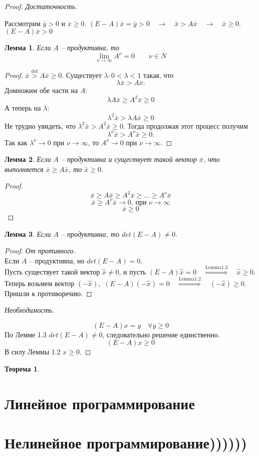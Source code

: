 \documentclass[12pt,a4paper,titlepage,oneside]{book}
\theoremstyle{definition}
\theoremstyle{plain}
\newtheorem{theorem}{Теорема}[chapter]
\theoremstyle{remark}
\theoremstyle{remark}
\theoremstyle{plain}
\newtheorem{lemma}{Лемма}[chapter]
\theoremstyle{plain}
\begin{document}
\begin{proof}
\textit{Достаточность.}

Рассмотрим $\bar{y} > 0$ и $\bar{x} \geq 0$. $(E-A)\bar{x} = \bar{y} > 0 \quad \rightarrow \quad \bar{x} > A\bar{x} \quad \rightarrow \quad \bar{x} \geq 0$. $(E-A)\bar{x} > 0$ 
\begin{lemma}
Если $A$ -- продуктивна, то
$$\lim_{\nu \to \infty} A^{\nu} = 0 \qquad \nu \in N$$

\end{lemma}
\begin{proof}
$ \bar{x} \overset{\mathrm{def}}{>} A \bar{x} \geq 0$. Существует $\lambda : 0 < \lambda < 1$ такая, что $$\lambda \bar{x} > A\bar{x}.$$ 
Домножим обе части на $A$:
$$\lambda A \bar{x} \geq A^2 \bar{x} \geq 0$$
А теперь на $\lambda$:
$$ \lambda^2 \bar{x} > \lambda A \bar{x} \geq 0$$
Не трудно увидеть, что $\lambda^2 \bar{x} > A^2 \bar{x} \geq 0$. Тогда продолжая этот процесс получим 
$$\lambda^{\nu} \bar{x} > A^{\nu} \bar{x} \geq 0.$$
Так как $\lambda^{\nu} \to 0$ при $ \nu \to \infty$, то $A^{\nu} \to 0 $ при $ \nu \to \infty.$
\end{proof}

\begin{lemma}
Если $A$ -- продуктивна и существует такой вектор $\bar{x}$, что выполняется $\bar{x} \geq A\bar{x}$, то $\bar{x} \geq 0.$
\end{lemma}
\begin{proof}

$$\bar{x} \geq A\bar{x} \geq A^2\bar{x} \geq \dots \geq A^{\nu} \bar{x}$$
$$\bar{x} \geq A^{\nu} \bar{x} \to 0 \text{, при } \nu \to \infty$$
$$\bar{x} \geq 0$$
\end{proof}

\begin{lemma}
Если $A$ -- продуктивна, то $det(E-A) \neq 0.$
\end{lemma}
\begin{proof}
\textit{От противного.}\\
Если $A$ -- продуктивна, но $det(E-A) = 0.$\\
Пусть существует такой вектор $\hat{x} \neq 0$, и пусть $(E-A)\hat{x} = 0 \quad \overset{\mathrm{Lemma 1.2}}{\Longrightarrow} \quad \hat{x} \geq 0$.\\
Теперь возьмем вектор $(-\hat{x}),$ $(E-A)(-\hat{x}) = 0 \quad \overset{\mathrm{Lemma 1.2}}{\Longrightarrow} \quad (-\hat{x}) \geq 0.$
Пришли к противоречию.
\end{proof}

\textit{Необходимость.}

$$(E-A)x=y \quad \forall y \geq 0$$
По Лемме 1.3 $det(E-A) \neq 0$, следовательно решение единственно.
$$(E-A)x \geq 0$$
В силу Леммы 1.2 $x \geq 0.$
\end{proof}

\begin{theorem}

\end{theorem}
\chapter{Линейное программирование}



\chapter{Нелинейное программирование))))))}
\end{document}
